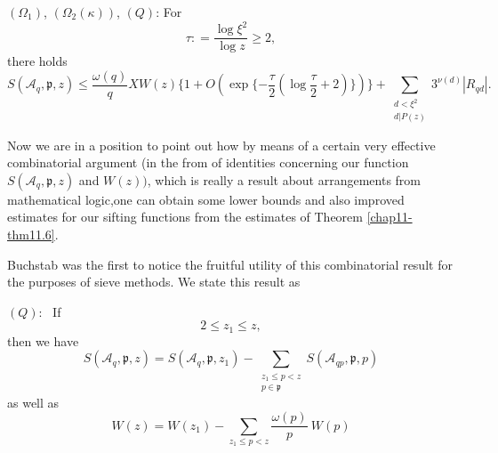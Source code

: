 \begin{theorem}\label{chap11-thm11.6}%
$(\Omega_1)$, $(\Omega_2(\kappa))$, $(Q)$:  For
\begin{equation*}
\tau : = \frac{\log \xi^2} {\log z} \ge 2,\tag{11.29}\label{eq11.29} 
\end{equation*}
there holds
\begin{equation*}
 S (\mathscr{A}_q, \mathfrak{p}, z ) \le \frac{\omega(q)} {q} X W(z)
 \{ 1+ O (\exp \{-\frac{\tau} {2} (\log \frac{\tau} {2} +2)\}) \}
 +\sum_{\substack{d<\xi^2\\ d|P(z)}}
 3^{\nu(d)} |R_{qd}|.\tag{11.30} \label{eq11.30} 
\end{equation*} 
\end{theorem}

Now we are in a position to point out how by means of a certain very
effective combinatorial argument (in the from of identities
concerning our function $S(\mathscr{A}_q,\mathfrak{p},z)$ and
$W(z))$, which is really a result about arrangements from mathematical
logic,one can obtain some lower bounds and also improved estimates for
our sifting functions from the estimates of Theorem \ref{chap11-thm11.6}.  

Buchstab was the first to notice the fruitful utility of this
combinatorial result for the purposes of sieve methods. We state this
result as 

\setcounter{section}{11}
\setcounter{lemma}{0}
\begin{lemma}\label{chap11-lem11.1}%
$(Q)$:~ If 
\begin{equation*}
2 \le z_1 \le z,\tag{11.31}\label{eq11.31}
\end{equation*} 
then we have 
\begin{equation*}
 S (\mathscr{A}_q, \mathfrak{p}, z )  = S (\mathscr{A}_q,
 \mathfrak{p}, z_1)-\sum_{\substack{z_1 \le p < z\\ p \in
     \mathfrak{p}}} S (\mathscr{A}_{qp},
 \mathfrak{p},p)\tag{11.32}\label{eq11.32}  
\end{equation*} 
as well as
\begin{equation*}
W(z) = W(z_1) - \sum\limits_{z_1 \le p < z} \frac{\omega(p)} {p}~
W(p)\tag{11.33}\label{eq11.33} 
\end{equation*}\pageoriginale
\end{lemma}

